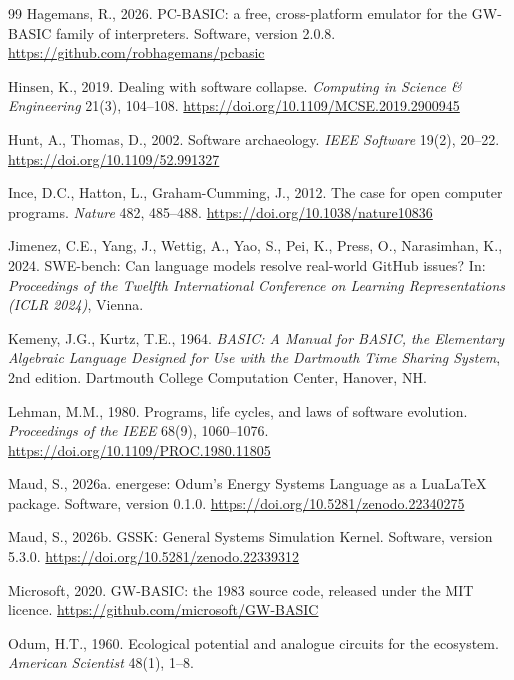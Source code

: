 \documentclass[3p,times,authoryear,twocolumn]{elsarticle}
\begin{document}
\begin{thebibliography}{99}
Hagemans, R., 2026. PC-BASIC: a free, cross-platform emulator for the GW-BASIC family of interpreters. Software, version 2.0.8. \url{https://github.com/robhagemans/pcbasic}

Hinsen, K., 2019. Dealing with software collapse. \emph{Computing in Science \& Engineering} 21(3), 104--108. \url{https://doi.org/10.1109/MCSE.2019.2900945}

Hunt, A., Thomas, D., 2002. Software archaeology. \emph{IEEE Software} 19(2), 20--22. \url{https://doi.org/10.1109/52.991327}

Ince, D.C., Hatton, L., Graham-Cumming, J., 2012. The case for open computer programs. \emph{Nature} 482, 485--488. \url{https://doi.org/10.1038/nature10836}

Jimenez, C.E., Yang, J., Wettig, A., Yao, S., Pei, K., Press, O., Narasimhan, K., 2024. SWE-bench: Can language models resolve real-world GitHub issues? In: \emph{Proceedings of the Twelfth International Conference on Learning Representations (ICLR 2024)}, Vienna.

Kemeny, J.G., Kurtz, T.E., 1964. \emph{BASIC: A Manual for BASIC, the Elementary Algebraic Language Designed for Use with the Dartmouth Time Sharing System}, 2nd edition. Dartmouth College Computation Center, Hanover, NH.

Lehman, M.M., 1980. Programs, life cycles, and laws of software evolution. \emph{Proceedings of the IEEE} 68(9), 1060--1076. \url{https://doi.org/10.1109/PROC.1980.11805}

Maud, S., 2026a. energese: Odum's Energy Systems Language as a LuaLaTeX package. Software, version 0.1.0. \url{https://doi.org/10.5281/zenodo.22340275}

Maud, S., 2026b. GSSK: General Systems Simulation Kernel. Software, version 5.3.0. \url{https://doi.org/10.5281/zenodo.22339312}

Microsoft, 2020. GW-BASIC: the 1983 source code, released under the MIT licence. \url{https://github.com/microsoft/GW-BASIC}

Odum, H.T., 1960. Ecological potential and analogue circuits for the ecosystem. \emph{American Scientist} 48(1), 1--8.


\end{thebibliography}
\end{document}
